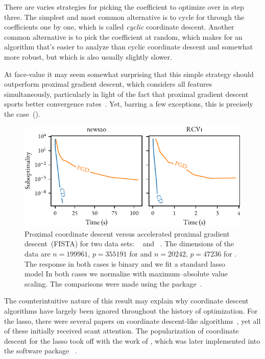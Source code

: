 There are varies strategies for picking the coefficient to optimize over in step three. The simplest and most common alternative is to cycle for through the coefficients one by one, which is called \emph{cyclic} coordinate descent. Another common alternative is to pick the coefficient at random, which makes for an algorithm that's easier to analyze than cyclic coordinate descent and somewhat more robust, but which is also usually slightly slower.

At face-value it may seem somewhat surprising that this simple strategy should outperform proximal gradient descent, which considers all features simultaneously, particularly in light of the fact that proximal gradient descent sports better convergence rates~\parencite{wright2015}. Yet, barring a few exceptions, this is precisely the case~().

\begin{figure}[htpb]
  \centering
  \includegraphics[]{figures/cd-vs-pgd.pdf}
  \caption{%
    Proximal coordinate descent versus accelerated proximal gradient descent~(FISTA) for two data sets: ~\parencite{keerthi2005} and ~\parencite{lewis2004}. The dimensions of the data are $n=\num{199961}$, $p=\num{355191}$ for  and $n = \num{20242}$,  $p=\num{47236}$ for . The response in both cases is binary and we fit a standard lasso model In both cases we normalize with maximum--absolute value scaling. The comparisons were made using the  package~\parencite{moreau2022a}.
  }
  \label{fig:cd-vs-pgd}
\end{figure}

The counterintuitive nature of this result may explain why coordinate descent algorithms have largely been ignored throughout the history of optimization. For the lasso, there were several papers on coordinate descent-like algorithms~\parencite{shevade2003,fu1998a, daubechies2004}, yet all of these initially received scant attention. The popularization of coordinate descent for the lasso took off with the work of \textcite{friedman2007}, which was later implemented into the software package ~\parencite{friedman2010}.

